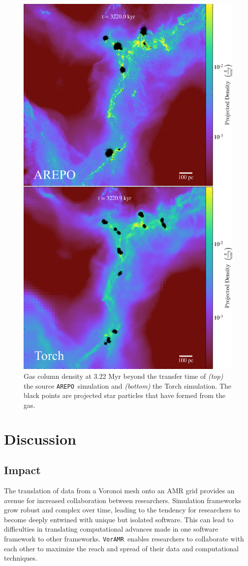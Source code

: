 \documentclass[twoside]{drexel-thesis}
\newcommand\voramr{\texttt{VorAMR}}
\newcommand\arepo{\texttt{AREPO}}
\begin{document}
\begin{thesis}
\begin{figure}[!htb]
\includegraphics[width=0.70\columnwidth]{star_formation_proof_labels.png}
    \caption{Gas column density at 3.22 Myr beyond the transfer time of {\em (top)} the source \arepo~simulation and {\em (bottom)} the Torch simulation. The black points are projected star particles that have formed from the gas.}
    \label{fig:runs}
\end{figure}

\section{Discussion}\label{sec:p2-discussion}
\subsection{Impact}
The translation of data from a Voronoi mesh onto an AMR grid provides an avenue for increased collaboration between researchers. Simulation frameworks grow robust and complex over time, leading to the tendency for researchers to become deeply entwined with unique but isolated software. This can lead to difficulties in translating computational advances made in one software framework to other frameworks. \voramr~enables researchers to collaborate with each other to maximize the reach and spread of their data and computational techniques. 


\end{thesis}
\end{document}
